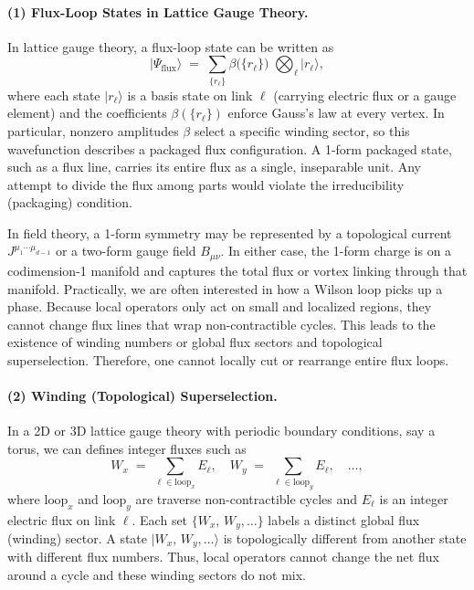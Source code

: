 \documentclass[12pt,a4paper]{article}
\begin{document}
\paragraph{(1) Flux-Loop States in Lattice Gauge Theory.}
In lattice gauge theory, a flux-loop state \cite{Zohar2016} can be written as
\[
\lvert \Psi_{\text{flux}}\rangle
\;=\;
\sum_{\{r_\ell\}} 
\beta \bigl(\{r_\ell\}\bigr)
\;\bigotimes_{\ell}\lvert r_\ell\rangle,
\]
where each state $\lvert r_\ell\rangle$ is a basis state on link $\ell$ (carrying electric flux or a gauge element) and the coefficients $\beta(\{r_\ell\})$ enforce Gauss's law at every vertex.
In particular, nonzero amplitudes $\beta$ select a specific winding sector, so this wavefunction describes a packaged flux configuration.
A 1-form packaged state, such as a flux line, carries its entire flux as a single, inseparable unit.
Any attempt to divide the flux among parts would violate the irreducibility (packaging) condition.


In field theory, a 1-form symmetry may be represented by a topological current $J^{\mu_1\cdots\mu_{d-1}}$ or a two-form gauge field $B_{\mu\nu}$.
In either case, the 1-form charge is on a codimension-1 manifold and captures the total flux or vortex linking through that manifold.
Practically, we are often interested in how a Wilson loop picks up a phase.
Because local operators only act on small and localized regions, they cannot change flux lines that wrap non-contractible cycles.
This leads to the existence of winding numbers or global flux sectors and topological superselection.
Therefore, one cannot locally cut or rearrange entire flux loops.


\paragraph{(2) Winding (Topological) Superselection.}
In a 2D or 3D lattice gauge theory with periodic boundary conditions, say a torus, we can defines integer fluxes such as
\[
W_x \;=\; \sum_{\ell \in \mathrm{loop}_x} E_\ell, 
\quad
W_y \;=\; \sum_{\ell \in \mathrm{loop}_y} E_\ell,
\quad \dots,
\]
where $\mathrm{loop}_x$ and $\mathrm{loop}_y$ are traverse non-contractible cycles and $E_\ell$ is an integer electric flux on link $\ell$.
Each set $\{W_x,\,W_y,\dots\}$ labels a distinct global flux (winding) sector.
A state $\lvert W_x,\,W_y,\dots\rangle$ is topologically different from another state with different flux numbers.
Thus, local operators cannot change the net flux around a cycle and these winding sectors do not mix.
\end{document}
